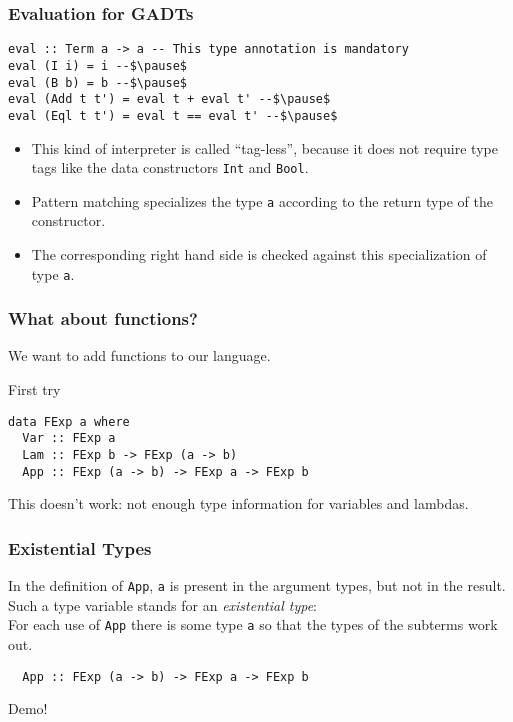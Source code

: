 \documentclass[pdftex,aspectratio=169]{beamer}
\begin{document}
\begin{frame}[fragile]
  \frametitle{Evaluation for GADTs}
  \begin{block}{}
    \begin{lstlisting}
eval :: Term a -> a -- This type annotation is mandatory
eval (I i) = i --$\pause$
eval (B b) = b --$\pause$
eval (Add t t') = eval t + eval t' --$\pause$
eval (Eql t t') = eval t == eval t' --$\pause$
    \end{lstlisting}
  \end{block}\pause
  \begin{itemize}[<+->]
  \item This kind of interpreter is called ``tag-less'', because it
    does not require type tags like the data constructors
    \lstinline{Int} and \lstinline{Bool}.
  \item Pattern matching specializes the type \lstinline{a} according
    to the return type of the constructor.
  \item The corresponding right hand side is checked against this
    specialization of type \lstinline{a}.
  \end{itemize}
\end{frame}

\begin{frame}[fragile]
  \frametitle{What about functions?}

  We want to add functions to our language.\pause

  \begin{block}{First try}
    \begin{lstlisting}
data FExp a where
  Var :: FExp a
  Lam :: FExp b -> FExp (a -> b)
  App :: FExp (a -> b) -> FExp a -> FExp b      
    \end{lstlisting}
  \end{block}\pause

  This doesn't work: not enough type information for variables and lambdas.
\end{frame}

\begin{frame}[fragile]
  \frametitle{Existential Types}

  In the definition of \lstinline{App}, \lstinline{a} is present in
  the argument types, but not in the result. Such a type variable
  stands for an \emph{existential type}: \\
  For each use of \lstinline{App} there is some type \lstinline{a} so
  that the types of the subterms work out.
  \begin{block}{}
    \begin{lstlisting}
  App :: FExp (a -> b) -> FExp a -> FExp b      
    \end{lstlisting}
  \end{block}\pause
  Demo!
\end{frame}
\end{document}
